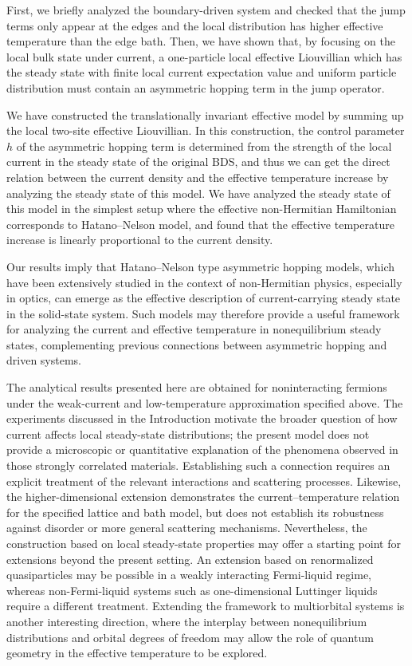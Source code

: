 \documentclass[a4paper, amsfonts, amssymb, amsmath, reprint, showkeys, nofootinbib, twoside,superscriptaddress, prb]{revtex4-2}
\begin{document}
First, we briefly analyzed the boundary-driven system and checked that the jump terms only appear at the edges and the local distribution has higher effective temperature than the edge bath. Then, we have shown that, by focusing on the local bulk state under current, a one-particle local effective Liouvillian which has the steady state with finite local current expectation value and uniform particle distribution must contain an asymmetric hopping term in the jump operator. 

We have constructed the translationally invariant effective model by summing up the local two-site effective Liouvillian. 
In this construction, the control parameter $h$ of the asymmetric hopping term is determined from the strength of the local current in the steady state of the original BDS, and thus we can get the direct relation between the current density and the effective temperature increase by analyzing the steady state of this model.
We have analyzed the steady state of this model in the simplest setup where the effective non-Hermitian Hamiltonian corresponds to Hatano--Nelson model, and found that the effective temperature increase is linearly proportional to the current density. 

Our results imply that Hatano--Nelson type asymmetric hopping models, which have been extensively studied in the context of non-Hermitian physics, especially in optics, can emerge as the effective description of current-carrying steady state in the solid-state system. 
Such models may therefore provide a useful framework for analyzing the current and effective temperature in nonequilibrium steady states, complementing previous connections between asymmetric hopping and driven systems\cite{Hatano1996-sw, Fukui1998-ey, Takasan2025-ql, Cao2023-mh}.

The analytical results presented here are obtained for noninteracting fermions under the weak-current and low-temperature approximation specified above. The experiments discussed in the Introduction motivate the broader question of how current affects local steady-state distributions; the present model does not provide a microscopic or quantitative explanation of the phenomena observed in those strongly correlated materials. Establishing such a connection requires an explicit treatment of the relevant interactions and scattering processes. Likewise, the higher-dimensional extension demonstrates the current--temperature relation for the specified lattice and bath model, but does not establish its robustness against disorder or more general scattering mechanisms.
Nevertheless, the construction based on local steady-state properties may offer a starting point for extensions beyond the present setting. An extension based on renormalized quasiparticles may be possible in a weakly interacting Fermi-liquid regime, whereas non-Fermi-liquid systems such as one-dimensional Luttinger liquids require a different treatment. Extending the framework to multiorbital systems is another interesting direction, where the interplay between nonequilibrium distributions and orbital degrees of freedom may allow the role of quantum geometry in the effective temperature to be explored.
\end{document}
